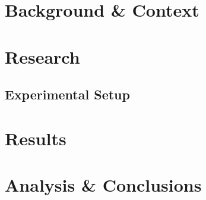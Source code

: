\documentclass{uvamscse}	%
\begin{document}
\chapter{Background \& Context}


\chapter{Research}

\section{Experimental Setup}

\chapter{Results}

\chapter{Analysis \& Conclusions}





\newpage

\end{document}
